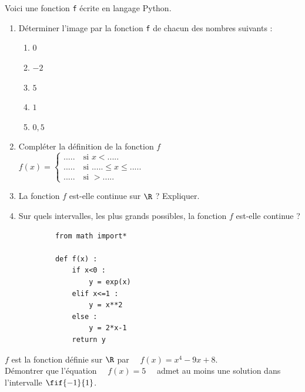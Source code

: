 \documentclass[a4paper,11pt,exos]{nsi} %
\begin{document}
\exo{ \faPython}
\begin{minipage}{10cm}
	Voici une fonction \texttt{f} écrite en langage Python.
	\begin{enumerate}
		\item Déterminer l'image par la fonction \texttt{f} de chacun des nombres suivants :
		\begin{multicols}{5}
			\begin{enumerate}[label=\textbullet]
				\item $0$
				\item $-2$
				\item $5$
				\item $1$
				\item $0,5$
			\end{enumerate}
		\end{multicols}
		\item  Compléter la définition de la fonction $f$ \\[.5em]
		$f(x)=\left\{
			\begin{array}{ll}
				.....\ & \text{si } x<..... \\
				.....\ & \text{si } .....\leqslant x\leqslant ..... \\
				.....\ & \text{si } > .....
			\end{array}
		\right.$
		\item La fonction $f$ est-elle continue sur $\R$ ? Expliquer.
		\item Sur quels intervalles, les plus grands possibles, la fonction $f$ est-elle continue ?
	\end{enumerate}
\end{minipage}
	\hspace*{.5cm}
\begin{minipage}{6.5cm}
	\begin{pyc}
		\begin{verbatim}
			from math import*

			def f(x) :
				if x<0 :
					y = exp(x)
				elif x<=1 :
					y = x**2
				else :
					y = 2*x-1
				return y
		\end{verbatim}
	\end{pyc}
\end{minipage}


\exo{}
$f$ est la fonction définie sur $\R$ par $\quad f(x)=x^4-9x+8$.\\
Démontrer que l'équation $\quad f(x)=5\quad$ admet au moins une solution dans l'intervalle $\fif{-1}{1}$.
\end{document}
